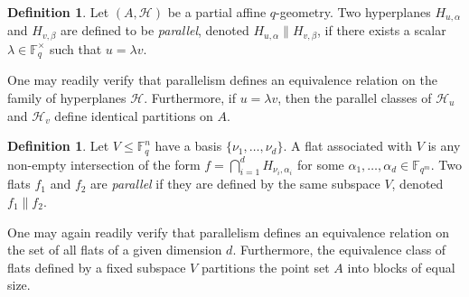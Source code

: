 \documentclass[a4paper,11pt,reqno]{article}
\newcommand{\F}{\mathbb{F}}
\theoremstyle{plain} \numberwithin{equation}{section}
\theoremstyle{definition}
\newtheorem{definition}[theorem]{Definition}
\begin{document}
\begin{definition} \label{def:parallelism}
 Let $(A,\mathcal{H})$ be a partial affine $q$-geometry. Two hyperplanes $H_{u,\alpha}$ and $H_{v,\beta}$ are defined to be \emph{parallel}, denoted $H_{u,\alpha}\| H_{v,\beta}$, if there exists a scalar $\lambda\in  \F_q^\times$ such that $u=\lambda v$.
\end{definition}

One may readily verify that parallelism defines an equivalence relation on the family of hyperplanes $\mathcal{H}$. Furthermore, if $u= \lambda v$, then the parallel classes of $\mathcal{H}_u$ and $\mathcal{H}_v$ define identical partitions on $A$.

\begin{definition}

Let $V\leq \F_q^n$ have a basis $\{\nu_1,\ldots,\nu_d\}$. A flat associated with $V$ is any non-empty intersection of the form $f= \bigcap ^d_{i=1} H_{\nu_i,\alpha_i}$ for some $\alpha_1,\ldots,\alpha_d\in \F_{q^m}$. Two flats $f_1$ and $f_2$ are \emph{parallel} if they are defined by the same subspace $V$, denoted $f_1\| f_2$.
\end{definition}

One may again readily verify that parallelism defines an equivalence relation on the set of all flats of a given dimension $d$. Furthermore, the equivalence class of flats defined by a fixed subspace $V$ partitions the point set $A$ into blocks of equal size.
\end{document}
